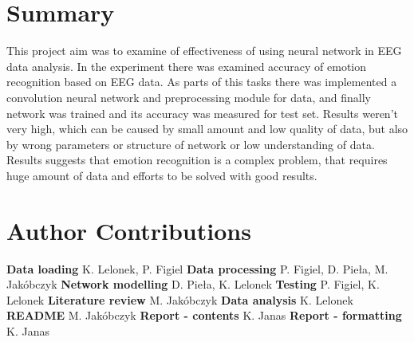 \documentclass[10pt,journal,compsoc]{IEEEtran}
\begin{document}
\section{Summary}
This project aim was to examine of  effectiveness of using neural network in EEG data analysis. In the experiment there was examined accuracy of emotion recognition based on EEG data. As parts of this tasks there was implemented a convolution neural network and preprocessing module for data, and finally network was trained and its accuracy was measured for test set. Results weren't very high, which can be caused by small amount and low quality of data, but also by wrong parameters or structure of network or low understanding of data. Results suggests that emotion recognition is a complex problem, that requires huge amount of data and efforts to be solved with good results.



%


\appendices
\section{Author Contributions}
\textbf{Data loading} K. Lelonek, P. Figiel \hfill \break
\textbf{Data processing} P. Figiel, D. Pieła, M. Jakóbczyk \hfill \break
\textbf{Network modelling} D. Pieła, K. Lelonek \hfill \break
\textbf{Testing} P. Figiel, K. Lelonek \hfill \break
\textbf{Literature review} M. Jakóbczyk \hfill \break
\textbf{Data analysis} K. Lelonek \hfill \break
\textbf{README} M. Jakóbczyk \hfill \break
\textbf{Report - contents} K. Janas \hfill \break
\textbf{Report - formatting} K. Janas \hfill \break
\end{document}
